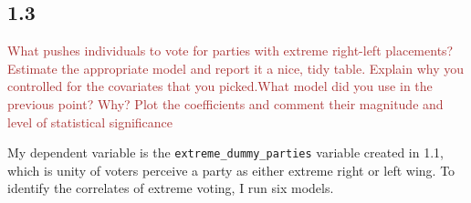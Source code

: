 \documentclass[
]{article}
\begin{document}
\hypertarget{section-2}{%
\subsection{1.3}\label{section-2}}

\textcolor{brown}{What pushes individuals to vote for parties with extreme right-left placements? Estimate the appropriate model and report it a nice, tidy table. Explain why you controlled for the covariates that you picked.What model did you use in the previous point? Why? Plot the coefficients and comment their magnitude and level of statistical significance}

My dependent variable is the \texttt{extreme\_dummy\_parties} variable
created in 1.1, which is unity of voters perceive a party as either
extreme right or left wing. To identify the correlates of extreme
voting, I run six models.
\end{document}
